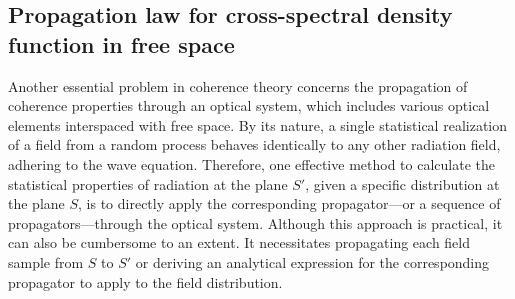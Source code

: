 \subsection{Propagation law for cross-spectral density function in free space}
    Another essential problem in coherence theory concerns the propagation of coherence properties through an optical system, which includes various optical elements interspaced with free space. By its nature, a single statistical realization of a field from a random process behaves identically to any other radiation field, adhering to the wave equation. Therefore, one effective method to calculate the statistical properties of radiation at the plane $S'$, given a specific distribution at the plane $S$, is to directly apply the corresponding propagator—or a sequence of propagators—through the optical system. Although this approach is practical, it can also be cumbersome to an extent. It necessitates propagating each field sample from $S$ to $S'$ or deriving an analytical expression for the corresponding propagator to apply to the field distribution.
 
